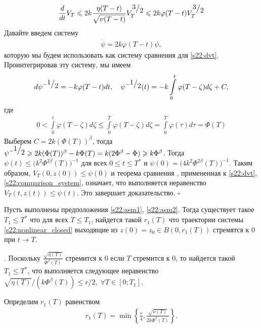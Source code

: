 \documentclass[../main.tex]{subfiles}
\begin{document}
\begin{gather}\label{s22:dvt}
    \frac{d}{dt}V_T \leqslant 2 k \frac{\eta(T-t)}{\sqrt{\nu(T-t)}}V_T^{\frc{3}{2}} \leqslant 2k \varphi(T-t) V_T^{\frc{3}{2}}
\end{gather}
Давайте введем систему
\begin{gather}\label{s22:comparison_system}
    \dot{\psi} = 2k \varphi(T-t) \psi,
\end{gather}
которую мы будем использовать как систему сравнения для \eqref{s22:dvt}. 
Проинтегрировав эту систему, мы имеем
\begin{gather*}
    d\psi^{-\frc{1}{2}} = -k \varphi(T-t) dt, \quad
    \psi^{-\frc{1}{2}}(t) = -k \int\limits_0^t \varphi(T-\zeta) d\zeta + C,
\end{gather*}
где
\begin{gather*}
    0 < \int\limits_0^t \varphi(T-\zeta) d\zeta \leqslant \int\limits_0^T \varphi(T-\zeta) d\zeta = 
    \int\limits_0^T \varphi(\tau) d\tau = \Phi(T) 
\end{gather*}
Выберем $C = 2k (\Phi(T))^{\beta}$, тогда $\psi^{-\frc{1}{2}} \geqslant 2k (\Phi(T))^{\beta} - k \Phi(T) = k (2\Phi^\beta - \Phi)\geqslant k\Phi^\beta $.
Тогда $\psi(t) \leqslant \big(k^2\Phi^{2\beta}(T)\big)^{-1}$ для всех $ 0 \leqslant t \leqslant T^* $ и $\psi(0) = \big(4k^2\Phi^{2\beta}(T)\big)^{-1} $.
Таким образом, $V_T(0,z(0))\leqslant \psi(0)$ и теорема сравнения \cite{walter}, примененная к \eqref{s22:dvt}, \eqref{s22:comparison_system}, означает, что выполняется неравенство $V_T(t,z(t))\leqslant \psi(t)$. 
Это завершает доказательство.
    \hfill $ \square $

\begin{theorem}\label{s22:th:tends_to_zero}
    Пусть выполнены предположения \ref{s22:asm1}, \ref{s22:asm2}. 
Тогда существует такое $ T_1 \leqslant T^*$ что для всех $ T \leqslant T_1$, найдется такой $ r_1(T)$ что траектории системы \eqref{s22:nonlinear_closed} выходящие из $z(0) = z_0 \in B(0,r_1(T))$ стремятся к $0$ при $t \to T$.
\end{theorem}

\doc. 
Поскольку $\frac{\sqrt{\eta(T)}}{\Phi^\beta(T)} $ стремится к $0$ если $T$ стремится к $0$, то найдется такой $ T_1 \leqslant T^*$, что выполняется следующее неравенство
$ \sqrt{\eta(T)}/(k\Phi^\beta(T))  \leqslant r/{2}, \; \forall T \in [0;T_1]$.

Определим $r_1(T)$ равенством
\begin{gather}\label{s22:r1}
    r_1(T) = \min \left\{ \frac{r}{4}, \frac{\sqrt{\nu(T)}}{2k\Phi^\beta(T)} \right\}.
\end{gather}
\end{document}
